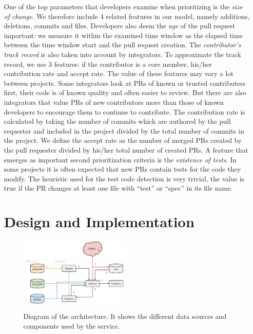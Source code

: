 \documentclass[conference]{IEEEtran}
\begin{document}
One of the top parameters that developers examine when prioritizing is the
\textsl{size of change}. We therefore include 4 related features in our
model, namely additions, deletions, commits and files.
Developers also deem the \textsl{age} of the pull request important: we measure
it within the examined time window as the elapsed time between the time window
start and the pull request creation.
The \textsl{contributor's track record} is also taken into account by
integrators. To approximate the track record, we use 3 features: if the
contributor is a core member, his/her contribution rate and accept rate. The
value of these features may vary a lot between projects. Some integrators look
at PRs of known or trusted contributers first, their code is of known quality
and often easier to review. But there are also integrators that value PRs of new
contributors more than those of known developers to encourage them to continue
to contribute. The contribution rate is calculated by taking the number of
commits which are authored by the pull requester and included in the project
divided by the total number of commits in the project. We define the accept
rate as the number of merged PRs created by the pull requester divided by
his/her total number of created PRs. A feature that emerges as important second
prioritization criteria is the \textsl{existence of tests}. In some projects it
is often expected that new PRs contain tests for the code they modify. The
heuristic used for the test code detection is very trivial, the value is true if
the PR changes at least one file with ``test'' or ``spec'' in its file name.

\section{Design and Implementation}
\label{sec:design}

\begin{figure}
  \centering
  \includegraphics[width=0.5\textwidth]{../figs/architecture.pdf}
  \caption[Diagram of the architecture]
   {Diagram of the architecture. It shows the different data sources and components used by the \prioritizer service.}
  \label{fig:architecture}
\end{figure}
\end{document}
